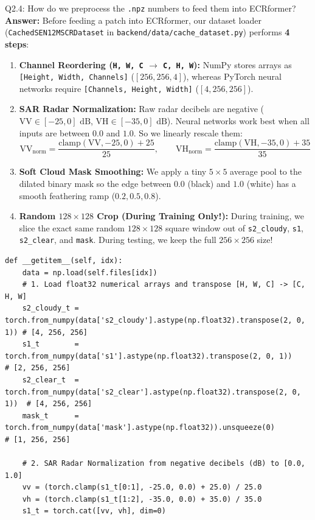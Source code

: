 \documentclass[11pt,a4paper]{article}
\begin{document}
\begin{qbox}{Q2.4: How do we preprocess the \texttt{.npz} numbers to feed them into ECRformer?}
\textbf{Answer:}
Before feeding a patch into ECRformer, our dataset loader (\texttt{CachedSEN12MSCRDataset} in \texttt{backend/data/cache\_dataset.py}) performs \textbf{4 steps}:
\begin{enumerate}[leftmargin=18pt]
    \item \textbf{Channel Reordering (\texttt{H, W, C} $\to$ \texttt{C, H, W}):} NumPy stores arrays as \texttt{[Height, Width, Channels]} ($[256, 256, 4]$), whereas PyTorch neural networks require \texttt{[Channels, Height, Width]} ($[4, 256, 256]$).
    \item \textbf{SAR Radar Normalization:} Raw radar decibels are negative ($\text{VV} \in [-25, 0]\text{ dB}$, $\text{VH} \in [-35, 0]\text{ dB}$). Neural networks work best when all inputs are between $0.0$ and $1.0$. So we linearly rescale them:
    $$\text{VV}_{\text{norm}} = \frac{\text{clamp}(\text{VV}, -25, 0) + 25}{25}, \qquad \text{VH}_{\text{norm}} = \frac{\text{clamp}(\text{VH}, -35, 0) + 35}{35}$$
    \item \textbf{Soft Cloud Mask Smoothing:} We apply a tiny $5\times 5$ average pool to the dilated binary mask so the edge between $0.0$ (black) and $1.0$ (white) has a smooth feathering ramp ($0.2, 0.5, 0.8$).
    \item \textbf{Random $128\times 128$ Crop (During Training Only!):} During training, we slice the exact same random $128\times 128$ square window out of \texttt{s2\_cloudy}, \texttt{s1}, \texttt{s2\_clear}, and \texttt{mask}. During testing, we keep the full $256\times 256$ size!
\end{enumerate}

\begin{lstlisting}[caption={Exact Data Loading \& Preprocessing Code (from \texttt{backend/data/cache\_dataset.py})}]
def __getitem__(self, idx):
    data = np.load(self.files[idx])
    # 1. Load float32 numerical arrays and transpose [H, W, C] -> [C, H, W]
    s2_cloudy_t = torch.from_numpy(data['s2_cloudy'].astype(np.float32).transpose(2, 0, 1)) # [4, 256, 256]
    s1_t        = torch.from_numpy(data['s1'].astype(np.float32).transpose(2, 0, 1))        # [2, 256, 256]
    s2_clear_t  = torch.from_numpy(data['s2_clear'].astype(np.float32).transpose(2, 0, 1))  # [4, 256, 256]
    mask_t      = torch.from_numpy(data['mask'].astype(np.float32)).unsqueeze(0)            # [1, 256, 256]

    # 2. SAR Radar Normalization from negative decibels (dB) to [0.0, 1.0]
    vv = (torch.clamp(s1_t[0:1], -25.0, 0.0) + 25.0) / 25.0
    vh = (torch.clamp(s1_t[1:2], -35.0, 0.0) + 35.0) / 35.0
    s1_t = torch.cat([vv, vh], dim=0)


\end{lstlisting}
\end{qbox}
\end{document}
